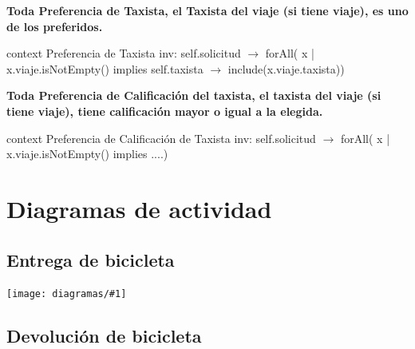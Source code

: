 \documentclass[a4paper, 10pt, twoside]{article}
\newcommand{\diagramav}[1]{%
  \texttt{[image: diagramas/\#1]}%
}
\newenvironment{ocl}[1]
  {
    \textbf{#1}
    \verbatim
  }{
    \endverbatim
  }
\begin{document}
\begin{ocl}{Toda Preferencia de Taxista, el Taxista del viaje (si tiene viaje), es uno de los preferidos.}
  context Preferencia de Taxista
  inv: self.solicitud $\rightarrow$ forAll( x | x.viaje.isNotEmpty() implies self.taxista $\rightarrow$ include(x.viaje.taxista))
\end{ocl}


\begin{ocl}{Toda Preferencia de Calificación del taxista, el taxista del viaje (si tiene viaje), tiene calificación mayor o igual a la elegida.}
  context Preferencia de Calificación de Taxista
  inv: self.solicitud $\rightarrow$ forAll( x | x.viaje.isNotEmpty() implies ....)
\end{ocl}
% 




\section{Diagramas de actividad}


\subsection{Entrega de bicicleta}
\label{sec:da-entrega-bicicleta}

\diagramav{da-entrega-bicicleta}


\subsection{Devolución de bicicleta}
\label{sec:da-devolucion-bicicleta}
\end{document}
